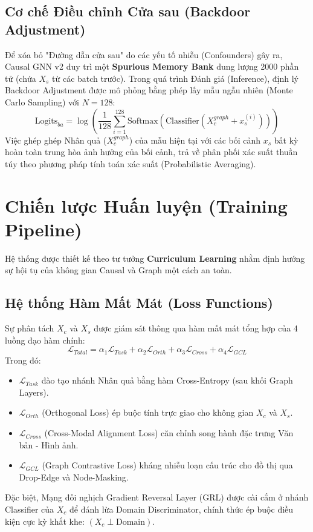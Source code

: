 \documentclass[11pt,a4paper]{article}
\begin{document}
\subsection{Cơ chế Điều chỉnh Cửa sau (Backdoor Adjustment)}
Để xóa bỏ "Đường dẫn cửa sau" do các yếu tố nhiễu (Confounders) gây ra, Causal GNN v2 duy trì một \textbf{Spurious Memory Bank} dung lượng 2000 phần tử (chứa $X_s$ từ các batch trước). Trong quá trình Đánh giá (Inference), định lý Backdoor Adjustment được mô phỏng bằng phép lấy mẫu ngẫu nhiên (Monte Carlo Sampling) với $N=128$:
\begin{equation}
\text{Logits}_{ba} = \log \left( \frac{1}{128} \sum_{i=1}^{128} \text{Softmax}(\text{Classifier}(X_c^{graph} + x_s^{(i)})) \right)
\end{equation}
Việc ghép ghép Nhân quả ($X_c^{graph}$) của mẫu hiện tại với các bối cảnh $x_s$ bất kỳ hoàn toàn trung hòa ảnh hưởng của bối cảnh, trả về phân phối xác suất thuần túy theo phương pháp tính toán xác suất (Probabilistic Averaging).

\section{Chiến lược Huấn luyện (Training Pipeline)}

Hệ thống được thiết kế theo tư tưởng \textbf{Curriculum Learning} nhằm định hướng sự hội tụ của không gian Causal và Graph một cách an toàn.

\subsection{Hệ thống Hàm Mất Mát (Loss Functions)}
Sự phân tách $X_c$ và $X_s$ được giám sát thông qua hàm mất mát tổng hợp của 4 luồng đạo hàm chính:
\begin{equation}
\mathcal{L}_{Total} = \alpha_1 \mathcal{L}_{Task} + \alpha_2 \mathcal{L}_{Orth} + \alpha_3 \mathcal{L}_{Cross} + \alpha_4 \mathcal{L}_{GCL}
\end{equation}
Trong đó:
\begin{itemize}
    \item $\mathcal{L}_{Task}$ đào tạo nhánh Nhân quả bằng hàm Cross-Entropy (sau khối Graph Layers).
    \item $\mathcal{L}_{Orth}$ (Orthogonal Loss) ép buộc tính trực giao cho không gian $X_c$ và $X_s$.
    \item $\mathcal{L}_{Cross}$ (Cross-Modal Alignment Loss) căn chỉnh song hành đặc trưng Văn bản - Hình ảnh.
    \item $\mathcal{L}_{GCL}$ (Graph Contrastive Loss) kháng nhiễu loạn cấu trúc cho đồ thị qua Drop-Edge và Node-Masking.
\end{itemize}
Đặc biệt, Mạng đối nghịch Gradient Reversal Layer (GRL) được cài cắm ở nhánh Classifier của $X_c$ để đánh lừa Domain Discriminator, chính thức ép buộc điều kiện cực kỳ khắt khe: $(X_c \perp \text{Domain})$.
\end{document}
